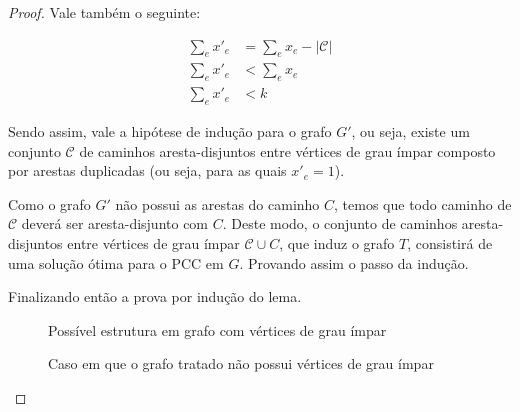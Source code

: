 \documentclass{article}
\begin{document}
\begin{proof}
    Vale também o seguinte:

    \begin{align*}
        \sum_e x'_e &= \sum_e x_e - |\mathcal{C}| \\ 
        \sum_e x'_e &< \sum_e x_e \\
        \sum_e x'_e &< k
    \end{align*}

    Sendo assim, vale a hipótese de indução para o grafo $G'$, ou seja, existe um conjunto $\mathcal{C}$ de caminhos aresta-disjuntos entre vértices de grau ímpar composto por arestas duplicadas (ou seja, para as quais $x'_e = 1$).

    Como o grafo $G'$ não possui as arestas do caminho $C$, temos que todo caminho de $\mathcal{C}$ deverá ser aresta-disjunto com $C$.
    Deste modo, o conjunto de caminhos aresta-disjuntos entre vértices de grau ímpar $\mathcal{C} \cup C$, que induz o grafo $T$, consistirá de uma solução ótima para o PCC em $G$.
    Provando assim o passo da indução.

    Finalizando então a prova por indução do lema.

    \begin{figure}
        \centering
        \caption{Possível estrutura em grafo com vértices de grau ímpar}
        \label{pcc-case1}
    \end{figure}
    \begin{figure}
        \centering
        \caption{Caso em que o grafo tratado não possui vértices de grau ímpar}
        \label{pcc-case2}
    \end{figure}

\end{proof}
\end{document}
